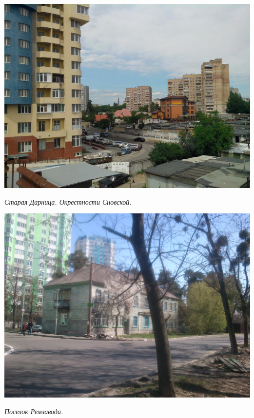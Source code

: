 \begin{center}
\includegraphics[width=0.95\linewidth]{lpix/IMG_20160613_141738.jpg}

\textit{Старая Дарница. Окрестности Сновской.}
\end{center}


\begin{center}
\includegraphics[width=\linewidth]{lpix/DSC_0013.JPG}

\textit{Поселок Ремзавода.}
\end{center}


